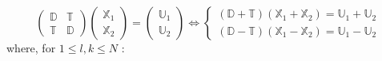 \begin{equation}
\begin{pmatrix}
\mathbb{D}&\mathbb{T}\\
\mathbb{T}&\mathbb{D}
\end{pmatrix}
\begin{pmatrix}
\mathbb{X}_1 \\
\mathbb{X}_2
\end{pmatrix}
=
\begin{pmatrix}
\mathbb{U}_1 \\
\mathbb{U}_2
\end{pmatrix}
\iff
\left\{
\begin{matrix}
(\mathbb{D}+\mathbb{T})(\mathbb{X}_1+\mathbb{X}_2)=\mathbb{U}_1+\mathbb{U}_2\\
(\mathbb{D}-\mathbb{T})(\mathbb{X}_1-\mathbb{X}_2)=\mathbb{U}_1-\mathbb{U}_2
\end{matrix}
\right.
\label{systmat}
\end{equation}
where, for $1\leq l,k \leq N$ :

